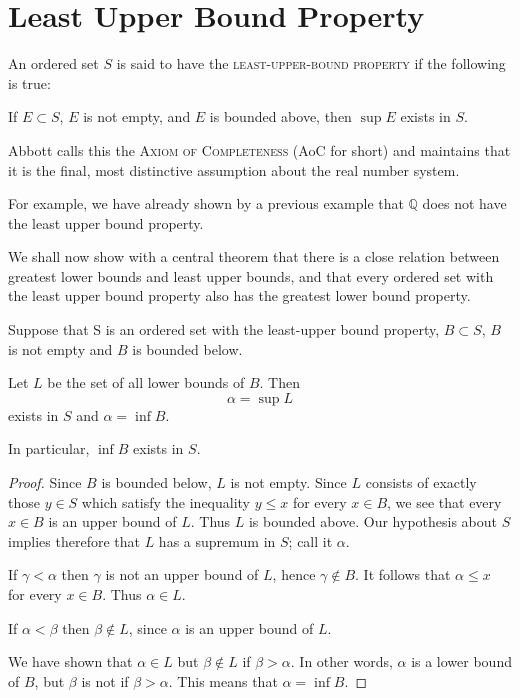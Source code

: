 \section{Least Upper Bound Property}
An ordered set $S$ is said to have the \textsc{least-upper-bound property} if the following is true:

\begin{fullwidth}
If $E \subset S$, $E$ is not empty, and $E$ is bounded above, then $\sup E $ exists in $S$.
\end{fullwidth}

Abbott calls this the \textsc{Axiom of Completeness} (AoC for short) and maintains that it is the final, most distinctive assumption about the real number system.

For example, we have already shown by a previous example that $\mathbb{Q}$ does not have the least upper bound property.


We shall now show with a central theorem that there is a close relation between greatest lower bounds and least upper bounds, and that every ordered set with the least upper bound property also has the greatest lower bound property.

\begin{theorem} 
Suppose that S is an ordered set with the least-upper bound property, $B \subset S$, $B$ is not empty and $B$ is bounded below.

Let $L$ be the set of all lower bounds of $B$.  Then
\[\alpha = \sup L\]
exists in $S$ and $\alpha = \inf B$.

In particular, $\inf B$ exists in $S$.
\end{theorem}

\begin{proof}
Since $B$ is bounded below, $L$ is not empty.  Since $L$ consists of exactly those $y \in S$ which satisfy the inequality $y \leq x$ for every $x \in B$, we see that every $x \in B$ is an upper bound of $L$.  Thus $L$ is bounded above.  Our hypothesis about $S$ implies therefore that $L$ has a supremum in $S$; call it $\alpha$.

If $\gamma < \alpha$ then $\gamma$ is not an upper bound of $L$, hence $\gamma \notin B$.  It follows that $\alpha \leq x$ for every $x \in B$.  Thus $\alpha \in L$.    

If $\alpha < \beta$ then $\beta \notin L$,  since $\alpha$ is an upper bound of $L$.

We have shown that $\alpha \in L$ but $\beta \notin L$ if $\beta> \alpha$.  In other words, $\alpha$ is a lower bound of $B$, but $\beta$ is not if $\beta>\alpha$.  This means that $\alpha = \inf B$.
\end{proof}

